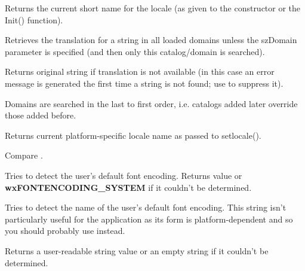 
Returns the current short name for the locale (as given to the constructor or
the Init() function).

\label{wxlocalegetstring}


Retrieves the translation for a string in all loaded domains unless the szDomain
parameter is specified (and then only this catalog/domain is searched).

Returns original string if translation is not available
(in this case an error message is generated the first time
a string is not found; use  to suppress it).


Domains are searched in the last to first order, i.e. catalogs
added later override those added before.

\label{wxlocalegetsysname}


Returns current platform-specific locale name as passed to setlocale().

Compare .


\label{wxlocalegetsystemencoding}


Tries to detect the user's default font encoding.
Returns  value or 
{\bf wxFONTENCODING\_SYSTEM} if it couldn't be determined.

\label{wxlocalegetsystemencodingname}


Tries to detect the name of the user's default font encoding. This string isn't
particularly useful for the application as its form is platform-dependent and
so you should probably use 
 instead.

Returns a user-readable string value or an empty string if it couldn't be
determined.

\label{wxlocalegetsystemlanguage}

